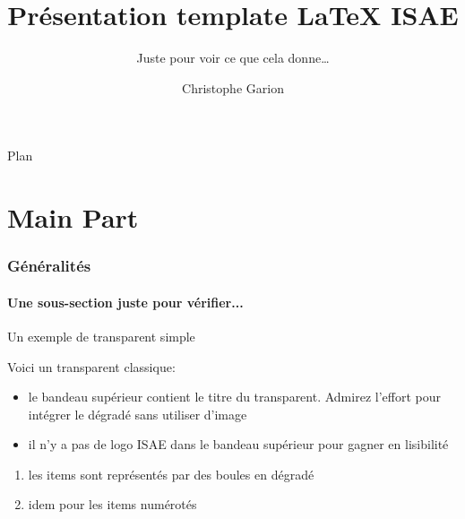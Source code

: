 \documentclass[fr,biblatex]{isae-slides}
\begin{document}
\title[Template \LaTeX{} ISAE]{Présentation template \LaTeX{} ISAE}
\subtitle{Juste pour voir ce que cela donne\ldots}
\author{Christophe Garion}
\subject{Slides to present my beamer class for ISAE slides.}
\date{}

\begin{frame}{}
  \titlepage
\end{frame}

\begin{frame}{Plan}
  \tableofcontents[part=1,pausesections]
\end{frame}


\part<presentation>{Main Part}

\section{Généralités}
\label{sec:gen}

\subsection{Une sous-section juste pour vérifier...}
\label{sec:sub}

\begin{frame}{Un exemple de transparent simple}

\vfill

Voici un transparent classique:

\begin{itemize}
\item le bandeau supérieur contient le titre du transparent. Admirez
  l'effort pour intégrer le dégradé sans utiliser d'image \smiley
\item il n'y a pas de logo ISAE dans le bandeau supérieur pour gagner
  en lisibilité
\end{itemize}

\begin{enumerate}
\item les items sont représentés par des boules en dégradé
\item idem pour les items numérotés
\end{enumerate}

\vfill

\end{frame}
\end{document}
